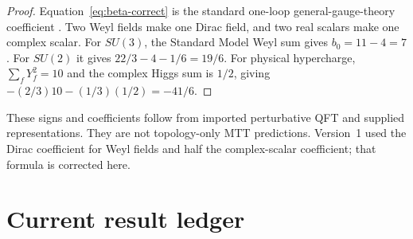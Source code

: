 \documentclass[11pt]{article}
\theoremstyle{plain}
\theoremstyle{definition}
\theoremstyle{remark}
\begin{document}
\begin{proof}
Equation~\eqref{eq:beta-correct} is the standard one-loop general-gauge-theory
coefficient \cite{MachacekVaughn1983}. Two Weyl fields make one Dirac field,
and two real scalars make one complex scalar. For $SU(3)$, the Standard Model
Weyl sum gives $b_0=11-4=7$. For $SU(2)$ it gives
$22/3-4-1/6=19/6$. For physical hypercharge,
$\sum_f Y_f^2=10$ and the complex Higgs sum is $1/2$, giving
$-(2/3)10-(1/3)(1/2)=-41/6$.
\end{proof}

These signs and coefficients follow from imported perturbative QFT and supplied
representations. They are not topology-only MTT predictions. Version~1 used
the Dirac coefficient for Weyl fields and half the complex-scalar coefficient;
that formula is corrected here.

\section{Current result ledger}
\end{document}
